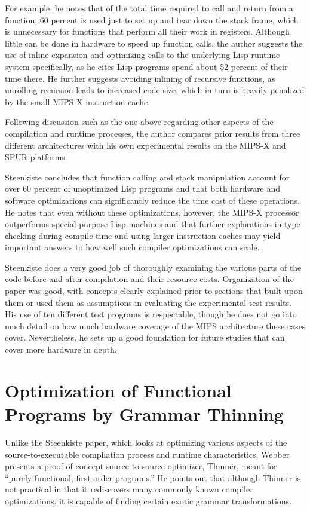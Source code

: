\documentclass[12pt,letterpaper]{article}
\begin{document}
For example, he notes that of the total time required to call and return from
a function, 60 percent is used just to set up and tear down the stack frame,
which is unnecessary for functions that perform all their work in registers.
Although little can be done in hardware to speed up function calls, the author
suggests the use of inline expansion and optimizing calls to the underlying
Lisp runtime system specifically, as he cites Lisp programs spend about 52
percent of their time there. He further suggests avoiding inlining of recursive
functions, as unrolling recursion leads to increased code size, which in turn
is heavily penalized by the small MIPS-X instruction cache.

Following discussion such as the one above regarding other aspects of the
compilation and runtime processes, the author compares prior results from three
different architectures with his own experimental results on the MIPS-X and
SPUR platforms.

Steenkiste concludes that function calling and stack manipulation account for
over 60 percent of unoptimized Lisp programs and that both hardware and
software optimizations can significantly reduce the time cost of these
operations. He notes that even without these optimizations, however, the MIPS-X
processor outperforms special-purpose Lisp machines and that further
explorations in type checking during compile time and using larger instruction
caches may yield important answers to how well such compiler optimizations can
scale.

Steenkiste does a very good job of thoroughly examining the various parts of
the code before and after compilation and their resource costs. Organization of
the paper was good, with concepts clearly explained prior to sections that
built upon them or used them as assumptions in evaluating the experimental test
results. His use of ten different test programs is respectable, though he does
not go into much detail on how much hardware coverage of the MIPS architecture
these cases cover. Nevertheless, he sets up a good foundation for future
studies that can cover more hardware in depth.


\section*{Optimization of Functional Programs by Grammar Thinning}

Unlike the Steenkiste paper, which looks at optimizing various aspects of the
source-to-executable compilation process and runtime characteristics, Webber
presents a proof of concept source-to-source optimizer, Thinner, meant for
``purely functional, first-order programs.'' He points out that although
Thinner is not practical in that it rediscovers many commonly known compiler
optimizations, it is capable of finding certain exotic grammar transformations.
\end{document}
